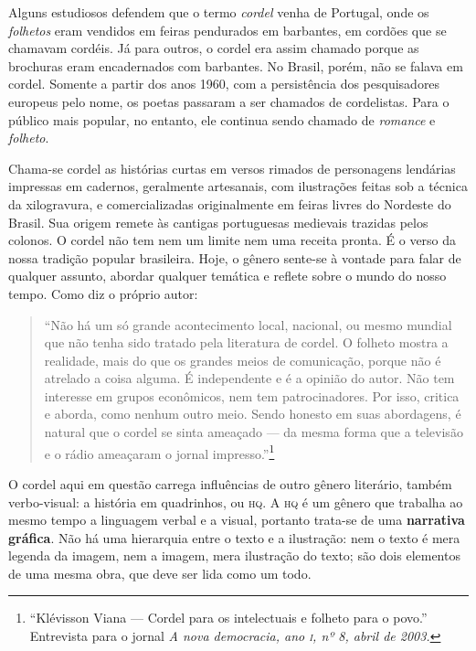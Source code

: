 \documentclass[11pt]{extarticle}
\begin{document}
Alguns estudiosos defendem que o termo \textit{cordel} venha de Portugal, onde os \textit{folhetos} 
eram vendidos em feiras pendurados em barbantes, em cordões que se chamavam cordéis. Já para
outros, o cordel era assim chamado porque as brochuras eram encadernados com barbantes. 
No Brasil, porém, não se falava em cordel. Somente a partir dos anos 1960, com a persistência 
dos pesquisadores europeus pelo nome, os poetas passaram a ser chamados de 
cordelistas. Para o público mais popular, no entanto, ele continua sendo chamado de \textit{romance} e 
\textit{folheto}.

Chama-se cordel as histórias curtas em versos rimados de personagens 
lendárias impressas em cadernos, geralmente artesanais, com ilustrações feitas sob a técnica da 
xilogravura, e comercializadas originalmente em feiras livres do Nordeste do Brasil. 
Sua origem remete às cantigas portuguesas medievais trazidas pelos colonos.
O cordel não tem nem um limite nem uma receita pronta. É o verso da 
nossa tradição popular brasileira. Hoje, o gênero sente-se à vontade para falar de qualquer 
assunto, abordar qualquer temática e reflete sobre o mundo do nosso tempo. Como diz o próprio
autor: 

\begin{quote}
``Não há um só grande acontecimento local, nacional, ou mesmo mundial que não tenha sido tratado 
pela literatura de cordel. O folheto mostra a realidade, mais do que os grandes meios de comunicação, 
porque não é atrelado a coisa alguma. É independente e é a opinião do autor. Não tem interesse em 
grupos econômicos, nem tem patrocinadores. Por isso, critica e aborda, como nenhum outro meio. 
Sendo honesto em suas abordagens, é natural que o cordel se sinta ameaçado --- da mesma forma que 
a televisão e o rádio ameaçaram o jornal impresso.''\footnote{``Klévisson Viana --- Cordel para os intelectuais e folheto para o povo.'' Entrevista para o jornal \textit{A nova democracia, ano \textsc{i}, nº 8, abril de 2003.}}
\end{quote}

O cordel aqui em questão carrega influências de outro gênero literário, também
verbo-visual: a história em quadrinhos, ou \textsc{hq}. A \textsc{hq} é um 
gênero que trabalha ao mesmo tempo a linguagem verbal e a visual, portanto trata-se de 
uma \textbf{narrativa gráfica}. Não há uma hierarquia entre o texto e a ilustração: nem 
o texto é mera legenda da imagem, nem a imagem, mera ilustração do texto; são dois elementos 
de uma mesma obra, que deve ser lida como um todo.
\end{document}
